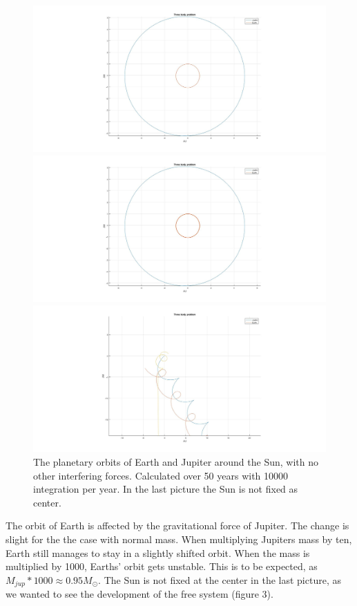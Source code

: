 \documentclass[10pt,a4paper]{article}
\begin{document}
\begin{figure} [H]  

\centerline{\includegraphics[scale=0.25]{ThreeBody3.jpg}}
\centerline{\includegraphics[scale=0.23]{ThreeBody12.jpg}}
\centerline{ \includegraphics[scale=0.23]{ThreeBody1001.jpg}}
\caption{The planetary orbits of Earth and Jupiter around the Sun, with no other interfering forces. Calculated over 50 years with 10000 integration per year. In the last picture the Sun is not fixed as center.}
\end{figure}
\noindent The orbit of Earth is affected by the gravitational force of Jupiter. The change is slight for the the case with normal mass. When multiplying Jupiters mass by ten, Earth still manages to stay in a slightly shifted orbit. When the mass is multiplied by 1000, Earths' orbit gets unstable. This is to be expected, as $M_{jup}*1000\approx0.95M_{\odot}$. The Sun is not fixed at the center in the last picture, as we wanted to see the development of the free system (figure 3). 
\end{document}
